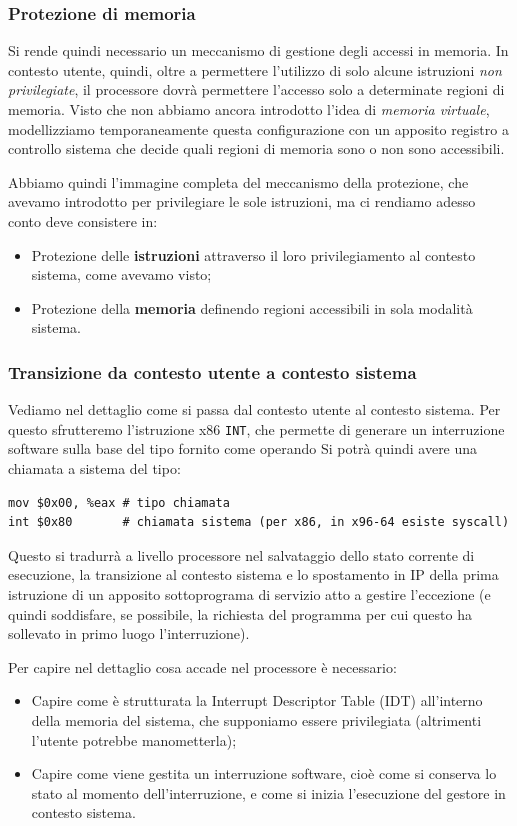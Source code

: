 \documentclass[a4paper,11pt]{article}
\begin{document}
\subsubsection{Protezione di memoria}
Si rende quindi necessario un meccanismo di gestione degli accessi in memoria.
In contesto utente, quindi, oltre a permettere l'utilizzo di solo alcune istruzioni \textit{non privilegiate}, il processore dovrà permettere l'accesso solo a determinate regioni di memoria. 
Visto che non abbiamo ancora introdotto l'idea di \textit{memoria virtuale}, modellizziamo temporaneamente questa configurazione con un apposito registro a controllo sistema che decide quali regioni di memoria sono o non sono accessibili.

Abbiamo quindi l'immagine completa del meccanismo della protezione, che avevamo introdotto per privilegiare le sole istruzioni, ma ci rendiamo adesso conto deve consistere in:
\begin{itemize}
	\item Protezione delle \textbf{istruzioni} attraverso il loro privilegiamento al contesto sistema, come avevamo visto;
	\item Protezione della \textbf{memoria} definendo regioni accessibili in sola modalità sistema.
\end{itemize}

\subsubsection{Transizione da contesto utente a contesto sistema}
Vediamo nel dettaglio come si passa dal contesto utente al contesto sistema.
Per questo sfrutteremo l'istruzione x86 \lstinline|INT|, che permette di generare un interruzione software sulla base del tipo fornito come operando 
Si potrà quindi avere una chiamata a sistema del tipo:
\begin{lstlisting}[language=assembler, style=codestyle]	
mov $0x00, %eax # tipo chiamata
int $0x80       # chiamata sistema (per x86, in x96-64 esiste syscall)
\end{lstlisting}

Questo si tradurrà a livello processore nel salvataggio dello stato corrente di esecuzione, la transizione al contesto sistema e lo spostamento in IP della prima istruzione di un apposito sottoprograma di servizio atto a gestire l'eccezione (e quindi soddisfare, se possibile, la richiesta del programma per cui questo ha sollevato in primo luogo l'interruzione).

Per capire nel dettaglio cosa accade nel processore è necessario:
\begin{itemize}
	\item Capire come è strutturata la Interrupt Descriptor Table (IDT) all'interno della memoria del sistema, che supponiamo essere privilegiata (altrimenti l'utente potrebbe manometterla);
	\item Capire come viene gestita un interruzione software, cioè come si conserva lo stato al momento dell'interruzione, e come si inizia l'esecuzione del gestore in contesto sistema.
\end{itemize}
\end{document}
